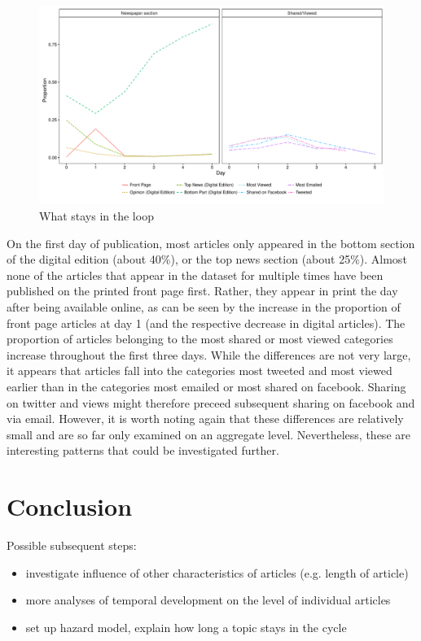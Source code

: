 \documentclass[12pt]{article}
\begin{document}
\begin{doublespace}
\begin{figure}
\caption{What stays in the loop}\label{fig:switch}
\includegraphics[width=\textwidth]{../calc/fig/switch} 
\end{figure}

On the first day of publication, most articles only appeared in the bottom section of the digital edition (about 40\%), or the top news section (about 25\%). Almost none of the articles that appear in the dataset for multiple times have been published on the printed front page first. Rather, they appear in print the day after being available online, as can be seen by the increase in the proportion of front page articles at day 1 (and the respective decrease in digital articles). The proportion of articles belonging to the most shared or most viewed categories increase throughout the first three days. While the differences are not very large, it appears that articles fall into the categories most tweeted and most viewed earlier than in the categories most emailed or most shared on facebook. Sharing on twitter and views might therefore preceed subsequent sharing on facebook and via email. However, it is worth noting again that these differences are relatively small and are so far only examined on an aggregate level. Nevertheless, these are interesting patterns that could be investigated further.


\clearpage
\section{Conclusion}


\vspace{1em}\noindent Possible subsequent steps:
\begin{itemize}\singlespacing
  \item investigate influence of other characteristics of articles (e.g. length of article)
  \item more analyses of temporal development on the level of individual articles
  \item set up hazard model, explain how long a topic stays in the cycle
\end{itemize}


\clearpage




\end{doublespace}
\end{document}
